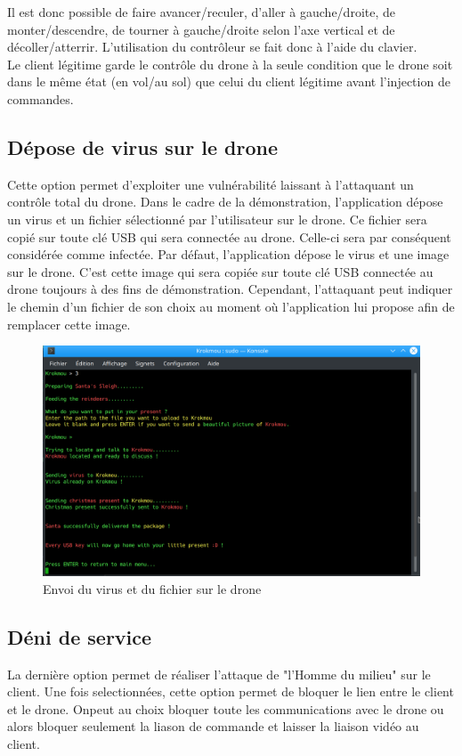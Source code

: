 Il est donc possible de faire avancer/reculer, d'aller à gauche/droite, de monter/descendre, de tourner à gauche/droite selon l'axe vertical et de décoller/atterrir. L'utilisation du contrôleur se fait donc à l'aide du clavier. \\
Le client légitime garde le contrôle du drone à la seule condition que le drone soit dans le même état (en vol/au sol) que celui du client légitime avant l'injection de commandes.

\subsection{Dépose de virus sur le drone}
Cette option permet d'exploiter une vulnérabilité laissant à l'attaquant un contrôle total du drone. Dans le cadre de la démonstration, l'application dépose un virus et un fichier sélectionné par l'utilisateur sur le drone. Ce fichier sera copié sur toute clé USB qui sera connectée au drone. Celle-ci sera par conséquent considérée comme infectée. Par défaut, l'application dépose le virus et une image sur le drone. C'est cette image qui sera copiée sur toute clé USB connectée au drone toujours à des fins de démonstration. Cependant, l'attaquant peut indiquer le chemin d'un fichier de son choix au moment où l'application lui propose afin de remplacer cette image.

\begin{figure}[H]
  \centering
  \includegraphics[scale=0.3]{images/virus.png}
  \caption{Envoi du virus et du fichier sur le drone}
\end{figure}

\subsection{Déni de service}
La dernière option permet de réaliser l'attaque de "l'Homme du milieu" sur le client. Une fois selectionnées, cette option permet de bloquer le lien entre le client et le drone. Onpeut au choix bloquer toute les communications avec le drone ou alors bloquer seulement la liason de commande et laisser la liaison vidéo au client.

